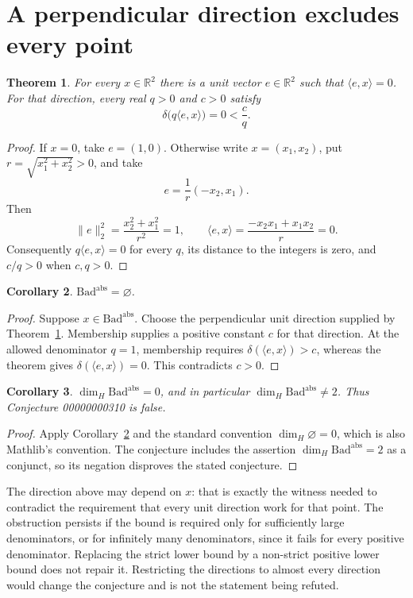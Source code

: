 \documentclass[11pt]{article}
\newtheorem{theorem}{Theorem}
\newtheorem{corollary}[theorem]{Corollary}
\newcommand{\R}{\mathbb R}
\newcommand{\Bad}{\mathrm{Bad}^{\mathrm{abs}}}
\newcommand{\ip}[2]{\langle #1,#2\rangle}
\begin{document}
\section{A perpendicular direction excludes every point}
\begin{theorem}\label{thm:perp}
For every $x\in\R^2$ there is a unit vector $e\in\R^2$ such that $\ip{e}{x}=0$. For that direction, every real $q>0$ and $c>0$ satisfy
\[
 \delta\bigl(q\ip{e}{x}\bigr)=0<\frac{c}{q}.
\]
\end{theorem}
\begin{proof}
If $x=0$, take $e=(1,0)$. Otherwise write $x=(x_1,x_2)$, put $r=\sqrt{x_1^2+x_2^2}>0$, and take
\[
 e=\frac{1}{r}(-x_2,x_1).
\]
Then
\[
 \|e\|_2^2=\frac{x_2^2+x_1^2}{r^2}=1,
 \qquad
 \ip{e}{x}=\frac{-x_2x_1+x_1x_2}{r}=0.
\]
Consequently $q\ip{e}{x}=0$ for every $q$, its distance to the integers is zero, and $c/q>0$ when $c,q>0$.
\end{proof}

\begin{corollary}\label{cor:empty}
$\Bad=\varnothing$.
\end{corollary}
\begin{proof}
Suppose $x\in\Bad$. Choose the perpendicular unit direction supplied by Theorem~\ref{thm:perp}. Membership supplies a positive constant $c$ for that direction. At the allowed denominator $q=1$, membership requires $\delta(\ip{e}{x})>c$, whereas the theorem gives $\delta(\ip{e}{x})=0$. This contradicts $c>0$.
\end{proof}

\begin{corollary}\label{cor:dimension}
$\dim_H\Bad=0$, and in particular $\dim_H\Bad\ne2$. Thus Conjecture 00000000310 is false.
\end{corollary}
\begin{proof}
Apply Corollary~\ref{cor:empty} and the standard convention $\dim_H\varnothing=0$, which is also Mathlib's convention. The conjecture includes the assertion $\dim_H\Bad=2$ as a conjunct, so its negation disproves the stated conjecture.
\end{proof}

The direction above may depend on $x$: that is exactly the witness needed to contradict the requirement that every unit direction work for that point. The obstruction persists if the bound is required only for sufficiently large denominators, or for infinitely many denominators, since it fails for every positive denominator. Replacing the strict lower bound by a non-strict positive lower bound does not repair it. Restricting the directions to almost every direction would change the conjecture and is not the statement being refuted.
\end{document}
